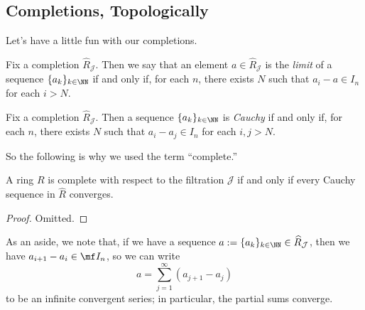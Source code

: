 \subsection{Completions, Topologically}
Let's have a little fun with our completions.
\begin{definition}[Limit]
	Fix a completion $\widehat R_\mathcal J$. Then we say that an element $a\in\widehat R_\mathcal J$ is the \textit{limit} of a sequence $\{a_k\}_{k\in\NN}$ if and only if, for each $n$, there exists $N$ such that $a_i-a\in I_n$ for each $i>N$.
\end{definition}
\begin{definition}
	Fix a completion $\widehat R_\mathcal J$. Then a sequence $\{a_k\}_{k\in\NN}$ is \textit{Cauchy} if and only if, for each $n$, there exists $N$ such that $a_i-a_j\in I_n$ for each $i,j>N$.
\end{definition}
So the following is why we used the term ``complete.''
\begin{lemma}
	A ring $R$ is complete with respect to the filtration $\mathcal J$ if and only if every Cauchy sequence in $\widehat R$ converges.
\end{lemma}
\begin{proof}
	Omitted.
\end{proof}
As an aside, we note that, if we have a sequence $a:=\{a_k\}_{k\in\NN}\in\widehat R_\mathcal J$, then we have $a_{i+1}-a_i\in\mf I_n$, so we can write
\[a=\sum_{j=1}^\infty(a_{j+1}-a_j)\]
to be an infinite convergent series; in particular, the partial sums converge.


